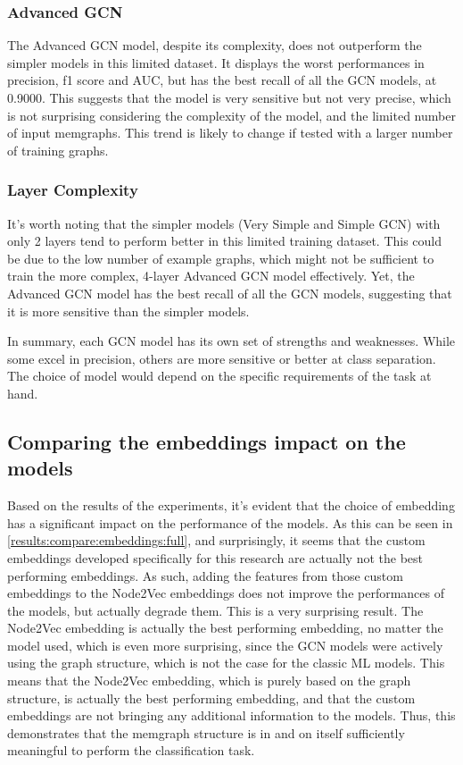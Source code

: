 \subsubsection{Advanced GCN}
The Advanced GCN model, despite its complexity, does not outperform the simpler models in this limited dataset. It displays the worst performances in precision, f1 score and AUC, but has the best recall of all the GCN models, at 0.9000. This suggests that the model is very sensitive but not very precise, which is not surprising considering the complexity of the model, and the limited number of input memgraphs. This trend is likely to change if tested with a larger number of training graphs.

\subsubsection{Layer Complexity}
It's worth noting that the simpler models (Very Simple and Simple GCN) with only 2 layers tend to perform better in this limited training dataset. This could be due to the low number of example graphs, which might not be sufficient to train the more complex, 4-layer Advanced GCN model effectively. Yet, the Advanced GCN model has the best recall of all the GCN models, suggesting that it is more sensitive than the simpler models.

In summary, each GCN model has its own set of strengths and weaknesses. While some excel in precision, others are more sensitive or better at class separation. The choice of model would depend on the specific requirements of the task at hand.

\subsection{Comparing the embeddings impact on the models}
Based on the results of the experiments, it's evident that the choice of embedding has a significant impact on the performance of the models. As this can be seen in \ref{results:compare:embeddings:full}, and surprisingly, it seems that the custom embeddings developed specifically for this research are actually not the best performing embeddings. As such, adding the features from those custom embeddings to the Node2Vec embeddings does not improve the performances of the models, but actually degrade them. This is a very surprising result. The Node2Vec embedding is actually the best performing embedding, no matter the model used, which is even more surprising, since the GCN models were actively using the graph structure, which is not the case for the classic ML models. This means that the Node2Vec embedding, which is purely based on the graph structure, is actually the best performing embedding, and that the custom embeddings are not bringing any additional information to the models. Thus, this demonstrates that the memgraph structure is in and on itself sufficiently meaningful to perform the classification task. 

